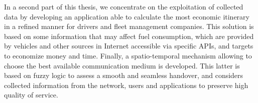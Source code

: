 In a second part of this thesis,
	we concentrate on the exploitation of collected data by developing an application able to calculate the most economic itinerary in a refined manner for drivers and fleet management companies.
This solution is based on some information that may affect fuel consumption,
	which are provided by vehicles and other sources in Internet accessible via specific APIs,
	and targets to economize money and time.
Finally,
	a spatio-temporal mechanism allowing to choose the best available communication medium is developed.
This latter is based on fuzzy logic to assess a smooth and seamless handover,
	and considers collected information from the network,
	users and applications to preserve high quality of service.



